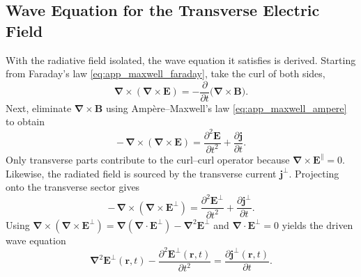 \subsection{Wave Equation for the Transverse Electric Field}
\label{app:subsec:wave_equation}
With the radiative field isolated, the wave equation it satisfies is derived. Starting from Faraday's law \autoref{eq:app_maxwell_faraday}, take the curl of both sides,
\begin{equation*}
	\boldsymbol{\nabla}\times(\boldsymbol{\nabla}\times\boldsymbol{E})
	= -\frac{\partial}{\partial t}\big(\boldsymbol{\nabla}\times\boldsymbol{B}\big).
\end{equation*}
Next, eliminate $\boldsymbol{\nabla}\times\boldsymbol{B}$ using Ampère--Maxwell's law \autoref{eq:app_maxwell_ampere} to obtain
\begin{equation*}
	-\,\boldsymbol{\nabla}\times(\boldsymbol{\nabla}\times\boldsymbol{E})
	= \frac{\partial^2\boldsymbol{E}}{\partial t^2} + \frac{\partial \boldsymbol{j}}{\partial t}.
\end{equation*}
Only transverse parts contribute to the curl--curl operator because $\boldsymbol{\nabla}\times\boldsymbol{E}^{\parallel}=0$. Likewise, the radiated field is sourced by the transverse current $\boldsymbol{j}^{\perp}$. Projecting onto the transverse sector gives
\begin{equation*}
	-\,\boldsymbol{\nabla}\times(\boldsymbol{\nabla}\times\boldsymbol{E}^{\perp})
	= \frac{\partial^2\boldsymbol{E}^{\perp}}{\partial t^2} + \frac{\partial \boldsymbol{j}^{\perp}}{\partial t}.
\end{equation*}
Using $\boldsymbol{\nabla}\times(\boldsymbol{\nabla}\times\boldsymbol{E}^{\perp}) = \boldsymbol{\nabla}(\boldsymbol{\nabla}\cdot\boldsymbol{E}^{\perp}) - \boldsymbol{\nabla}^2\boldsymbol{E}^{\perp}$ and $\boldsymbol{\nabla}\cdot\boldsymbol{E}^{\perp}=0$ yields the driven wave equation
\begin{equation}
	\boldsymbol{\nabla}^2\boldsymbol{E}^{\perp}(\boldsymbol{r},t)
	- \frac{\partial^2\boldsymbol{E}^{\perp}(\boldsymbol{r},t)}{\partial t^2}
	= \frac{\partial \boldsymbol{j}^{\perp}(\boldsymbol{r},t)}{\partial t}.
	\label{eq:app_wave_E_perp_j}
\end{equation}

